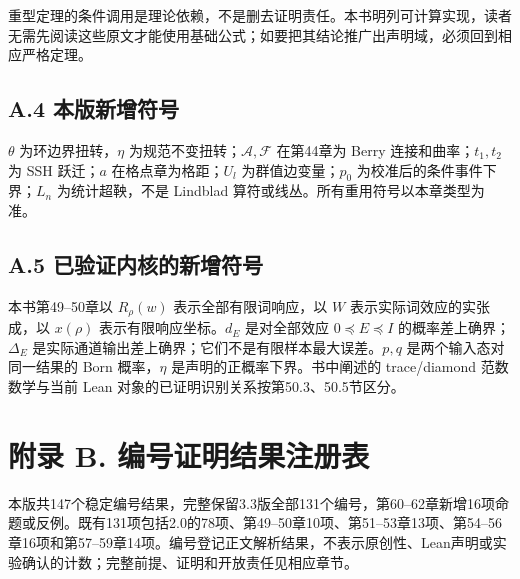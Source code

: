 \documentclass[
  11pt,
  oneside]{book}
\begin{document}
重型定理的条件调用是理论依赖，不是删去证明责任。本书明列可计算实现，读者无需先阅读这些原文才能使用基础公式；如要把其结论推广出声明域，必须回到相应严格定理。

\hypertarget{a.4-ux672cux7248ux65b0ux589eux7b26ux53f7}{%
\section{A.4
本版新增符号}\label{a.4-ux672cux7248ux65b0ux589eux7b26ux53f7}}

\(\theta\) 为环边界扭转，\(\eta\)
为规范不变扭转；\(\mathcal A,\mathcal F\) 在第44章为 Berry
连接和曲率；\(t_1,t_2\) 为 SSH 跃迁；\(a\) 在格点章为格距；\(U_l\)
为群值边变量；\(p_0\) 为校准后的条件事件下界；\(L_n\) 为统计超鞅，不是
Lindblad 算符或线丛。所有重用符号以本章类型为准。

\hypertarget{a.5-ux5df2ux9a8cux8bc1ux5185ux6838ux7684ux65b0ux589eux7b26ux53f7}{%
\section{A.5
已验证内核的新增符号}\label{a.5-ux5df2ux9a8cux8bc1ux5185ux6838ux7684ux65b0ux589eux7b26ux53f7}}

本书第49--50章以 \(R_\rho(w)\) 表示全部有限词响应，以 \(W\)
表示实际词效应的实张成，以 \(x(\rho)\) 表示有限响应坐标。\(d_E\)
是对全部效应 \(0\preceq E\preceq I\) 的概率差上确界；\(\Delta_E\)
是实际通道输出差上确界；它们不是有限样本最大误差。\(p,q\)
是两个输入态对同一结果的 Born 概率，\(\eta\)
是声明的正概率下界。书中阐述的 trace/diamond 范数数学与当前 Lean
对象的已证明识别关系按第50.3、50.5节区分。

\hypertarget{appendix-b}{%
\chapter{附录 B. 编号证明结果注册表}\label{appendix-b}}

本版共147个稳定编号结果，完整保留3.3版全部131个编号，第60--62章新增16项命题或反例。既有131项包括2.0的78项、第49--50章10项、第51--53章13项、第54--56章16项和第57--59章14项。编号登记正文解析结果，不表示原创性、Lean声明或实验确认的计数；完整前提、证明和开放责任见相应章节。
\end{document}
